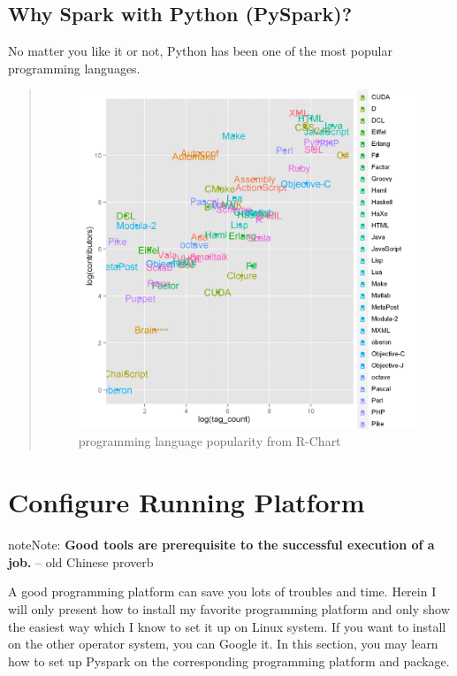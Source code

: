 \documentclass[letterpaper,11pt,english]{sphinxmanual}
\begin{document}
\section{Why Spark with Python (PySpark)?}
\label{why:why-spark-with-python-pyspark}
No matter you like it or not, Python has been one of the most popular programming languages.
\begin{quote}
\begin{figure}[htbp]
\centering
\capstart

\includegraphics{languages.png}
\caption{programming language popularity from R-Chart}\label{why:fig-languages}\end{figure}
\end{quote}


\chapter{Configure Running Platform}
\label{setup:configure-running-platform}\label{setup:r-chart}\label{setup::doc}\label{setup:setup}
\begin{notice}{note}{Note:}
\textbf{Good tools are prerequisite to the successful execution
of a job.} -- old Chinese proverb
\end{notice}

A good programming platform can save you lots of troubles and time.
Herein I will only present how to install my favorite programming
platform and only show the easiest way which I know to set it up
on Linux system. If you want to install on the other operator
system, you can Google it. In this section, you may learn how to
set up Pyspark on the corresponding programming platform and package.
\end{document}
